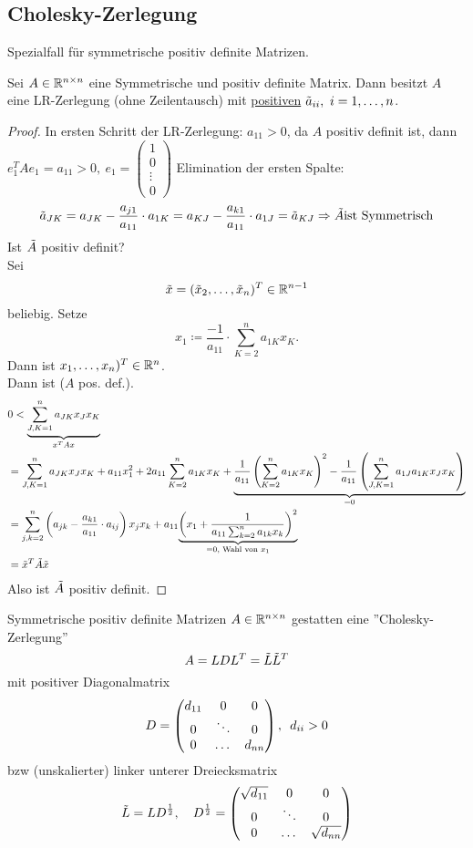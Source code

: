 \documentclass[../Skript.tex]{subfiles}
\begin{document}
\subsection{Cholesky-Zerlegung}
Spezialfall für symmetrische positiv definite Matrizen.
\begin{theorem}
    Sei $A\in \Rnm{n}{}$ eine Symmetrische und positiv definite Matrix.
    Dann besitzt \(A\) eine LR-Zerlegung (ohne Zeilentausch) mit 
    \underline{positiven} \(\Tilde{a}_{ii}, \ i=1,\dots,n\).
\end{theorem}
\begin{proof}
    In ersten Schritt der LR-Zerlegung: \(a_{11}>0\), da \(A\) positiv 
    definit ist, dann \(e_1^T A e_1=a_{11}>0, \ e_1=\begin{pmatrix}
        1\\ 0\\ \vdots \\ 0
    \end{pmatrix}\)
    Elimination der ersten Spalte: \[\Tilde{a}_{JK}=a_{JK}-\frac{a_{j1}}
    {a_{11}}\cdot a_{1K}= a_{KJ}-\frac{a_{k1}}{a_{11}}\cdot 
    a_{1J}=\Tilde{a}_{KJ}\Rightarrow \Tilde{A} \text{ist Symmetrisch}
    \]
    Ist \(\Tilde{A}\) positiv definit?\\
    Sei \[
    \Tilde{x}=(\Tilde{x}_2,\dots,\Tilde{x}_n)^T\in\mathbb{R}^{n-1}
    \]
    beliebig. Setze \[
    x_1\coloneqq\frac{-1}{a_{11}}\cdot\sum_{K=2}^n a_{1K}x_K
    .\]
    Dann ist \(x_1,\dots,x_n)^T\in\mathbb{R}^n\).\\
    Dann ist (\(A\) pos. def.). 
    \begin{align*}
    &0<\underset{x^TAx}{\underbrace{\sum_{J,K=1}^na_{JK}x_Jx_K}}\\
    &=\sum_{J,K=1}^na_{JK}x_Jx_K+a_{11}x_1^2+2a_{11}\sum_{K=2}^n a_{1K} 
    x_K + \underset{=0}{\underbrace{\frac{1}{a_{11}} \left(\sum_{K=2}^n 
    a_{1K} x_K\right)^2-\frac{1}{a_{11}}\left(\sum_{J,K=1}^n 
    a_{1J}a_{1K}x_Jx_K\right)}}\\
    &= \sum_{j,k=2}^n \left(a_{jk} - \frac{a_{k1}}{a_{11}}\cdot 
    a_{ij}\right)x_jx_k + a_{11}\underset{=0, \text{ Wahl von 
    }x_1}{\underbrace{\left(x_1 + \frac{1}{a_{11} \sum_{k=2}^n a_{1k} 
    x_k}\right)^2}}\\
    &= \Tilde{x}^T \Tilde{A}\Tilde{x}
    \end{align*}
    Also ist $\Tilde{A}$ positiv definit.
\end{proof}
\begin{theorem}
    Symmetrische positiv definite Matrizen $A\in \Rnm{n}{}$ gestatten eine
    ''Cholesky-Zerlegung'' \[
        A=LDL^T = \Tilde{L}\Tilde{L}^T
    \]
    mit positiver Diagonalmatrix \[
        D = \begin{pmatrix}d_{11}& 0 & 0 \\
        0 & \ddots & 0 \\
        0 & \dots  & d_{nn}\end{pmatrix},\hspace{.5em}  d_{ii} > 0
    \]
    bzw (unskalierter) linker unterer Dreiecksmatrix \[
        \Tilde{L} = LD^{\frac{1}{2}}, \hspace{1em} D^{\frac{1}{2}}=\begin{pmatrix}
        \sqrt{d_{11}} & 0 & 0\\
        0 & \ddots & 0 \\
        0 & \dots & \sqrt{d_{nn}}
        \end{pmatrix}
    \]
\end{theorem}
\end{document}
